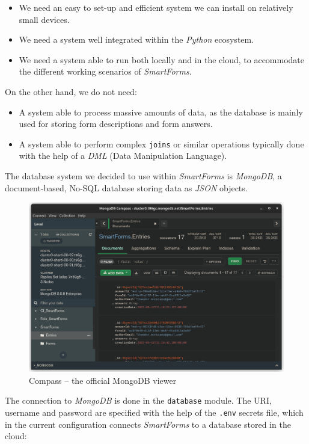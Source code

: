 \documentclass[11pt, a4paper]{report}
\def\code#1{\texttt{#1}}
\begin{document}
\begin{itemize}
    \item We need an easy to set-up and efficient system we can install on relatively small devices.
    \item We need a system well integrated within the \textit{Python} ecosystem.
    \item We need a system able to run both locally and in the cloud, to accommodate the different working scenarios of \textit{SmartForms}.
\end{itemize}

On the other hand, we do not need:
\begin{itemize}
    \item A system able to process massive amounts of data, as the database is mainly used for storing form descriptions and form answers.
    \item A system able to perform complex \code{joins} or similar operations typically done with the help of a \textit{DML} (Data Manipulation Language). 
\end{itemize}

The database system we decided to use within \textit{SmartForms} is \textit{MongoDB}, a document-based, No-SQL database storing data as \textit{JSON} objects.


\begin{figure}[!h]
    \centering
    \includegraphics[width=35em]{images/screenshoots/mongo-compas.png}
    \caption{Compass -- the official MongoDB viewer}
    \label{fig:label}
\end{figure}

The connection to \textit{MongoDB} is done in the \code{database} module. The URI, username and password are specified with the help of the \code{.env} secrets file, which in the current configuration connects \textit{SmartForms} to a database stored in the cloud:
\end{document}
